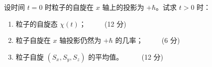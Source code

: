 设时间 $t = 0$ 时粒子的自旋在 $x$ 轴上的投影为 $+\hbar$。试求 $t > 0$ 时：

\begin{enumerate}
    \item 粒子的自旋态 $\chi(t)$； $\qquad $ (12 分)
    \item 粒子自旋在 $x$ 轴投影仍然为 $+\hbar$ 的几率； $\qquad $ (6 分)
    \item 粒子自旋 $(S_x, S_y, S_z)$ 的平均值。 $\qquad $ (12 分)
\end{enumerate}
